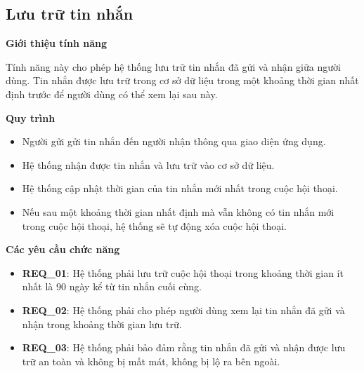 \subsection{Lưu trữ tin nhắn}

\noindent \textbf{Giới thiệu tính năng}

Tính năng này cho phép hệ thống lưu trữ tin nhắn đã gửi và nhận giữa người dùng. Tin nhắn được lưu trữ trong cơ sở dữ liệu trong một khoảng thời gian nhất định trước để người dùng có thể xem lại sau này.

\noindent \textbf{Quy trình}

\begin{itemize}
    \item Người gửi gửi tin nhắn đến người nhận thông qua giao diện ứng dụng.
    \item Hệ thống nhận được tin nhắn và lưu trữ vào cơ sở dữ liệu.
    \item Hệ thống cập nhật thời gian của tin nhắn mới nhất trong cuộc hội thoại.
    \item Nếu sau một khoảng thời gian nhất định mà vẫn không có tin nhắn mới trong cuộc hội thoại, hệ thống sẽ tự động xóa cuộc hội thoại.
\end{itemize}

\noindent \textbf{Các yêu cầu chức năng}

\begin{itemize}
\item \textbf{REQ\_01}: Hệ thống phải lưu trữ cuộc hội thoại trong khoảng thời gian ít nhất là 90 ngày kể từ tin nhắn cuối cùng.
\item \textbf{REQ\_02}: Hệ thống phải cho phép người dùng xem lại tin nhắn đã gửi và nhận trong khoảng thời gian lưu trữ.
\item \textbf{REQ\_03}: Hệ thống phải bảo đảm rằng tin nhắn đã gửi và nhận được lưu trữ an toàn và không bị mất mát, không bị lộ ra bên ngoài.
\end{itemize}
